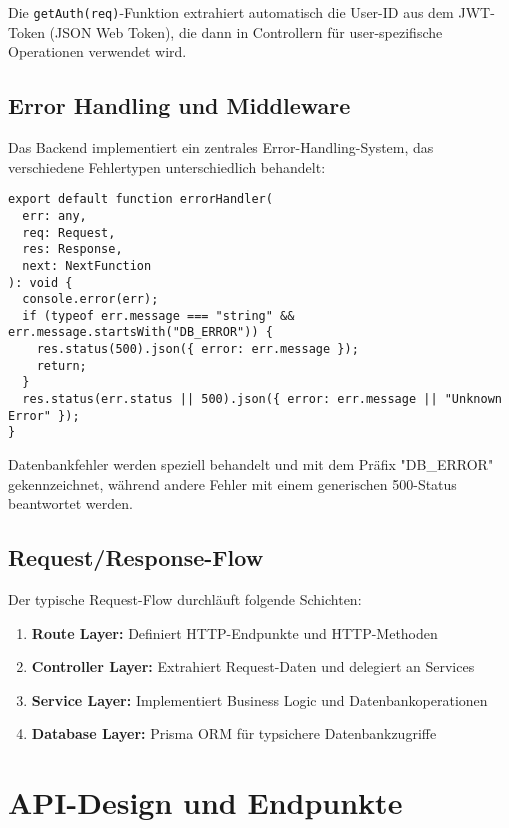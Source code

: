 Die \texttt{getAuth(req)}-Funktion extrahiert automatisch die User-ID aus dem JWT-Token (JSON Web Token), die dann in Controllern für user-spezifische Operationen verwendet wird.

\subsection{Error Handling und Middleware}

Das Backend implementiert ein zentrales Error-Handling-System, das verschiedene Fehlertypen unterschiedlich behandelt:

\begin{lstlisting}[style=typescriptstyle,caption={Zentraler Error Handler}]
export default function errorHandler(
  err: any,
  req: Request,
  res: Response,
  next: NextFunction
): void {
  console.error(err);
  if (typeof err.message === "string" && err.message.startsWith("DB_ERROR")) {
    res.status(500).json({ error: err.message });
    return;
  }
  res.status(err.status || 500).json({ error: err.message || "Unknown Error" });
}
\end{lstlisting}

Datenbankfehler werden speziell behandelt und mit dem Präfix "DB\_ERROR" gekennzeichnet, während andere Fehler mit einem generischen 500-Status beantwortet werden.

\subsection{Request/Response-Flow}

Der typische Request-Flow durchläuft folgende Schichten:

\begin{enumerate}
    \item \textbf{Route Layer:} Definiert HTTP-Endpunkte und HTTP-Methoden
    \item \textbf{Controller Layer:} Extrahiert Request-Daten und delegiert an Services
    \item \textbf{Service Layer:} Implementiert Business Logic und Datenbankoperationen
    \item \textbf{Database Layer:} Prisma ORM für typsichere Datenbankzugriffe
\end{enumerate}

\section{API-Design und Endpunkte}

